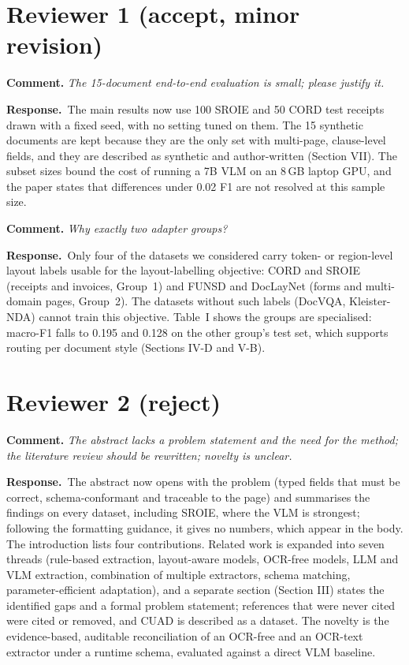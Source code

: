 \documentclass[11pt]{article}
\newcommand{\rc}[1]{\par\medskip\textbf{Comment.} \emph{#1}\par}
\newcommand{\rr}{\textbf{Response.}\ }
\begin{document}
\section*{Reviewer 1 (accept, minor revision)}

\rc{The 15-document end-to-end evaluation is small; please justify it.}
\rr The main results now use 100 SROIE and 50 CORD test receipts drawn with a fixed seed, with no setting tuned on them. The 15 synthetic documents are kept because they are the only set with multi-page, clause-level fields, and they are described as synthetic and author-written (Section VII). The subset sizes bound the cost of running a 7B VLM on an 8\,GB laptop GPU, and the paper states that differences under 0.02 F1 are not resolved at this sample size.

\rc{Why exactly two adapter groups?}
\rr Only four of the datasets we considered carry token- or region-level layout labels usable for the layout-labelling objective: CORD and SROIE (receipts and invoices, Group~1) and FUNSD and DocLayNet (forms and multi-domain pages, Group~2). The datasets without such labels (DocVQA, Kleister-NDA) cannot train this objective. Table~I shows the groups are specialised: macro-F1 falls to 0.195 and 0.128 on the other group's test set, which supports routing per document style (Sections IV-D and V-B).

\section*{Reviewer 2 (reject)}

\rc{The abstract lacks a problem statement and the need for the method; the literature review should be rewritten; novelty is unclear.}
\rr The abstract now opens with the problem (typed fields that must be correct, schema-conformant and traceable to the page) and summarises the findings on every dataset, including SROIE, where the VLM is strongest; following the formatting guidance, it gives no numbers, which appear in the body. The introduction lists four contributions. Related work is expanded into seven threads (rule-based extraction, layout-aware models, OCR-free models, LLM and VLM extraction, combination of multiple extractors, schema matching, parameter-efficient adaptation), and a separate section (Section III) states the identified gaps and a formal problem statement; references that were never cited were cited or removed, and CUAD is described as a dataset. The novelty is the evidence-based, auditable reconciliation of an OCR-free and an OCR-text extractor under a runtime schema, evaluated against a direct VLM baseline.
\end{document}
